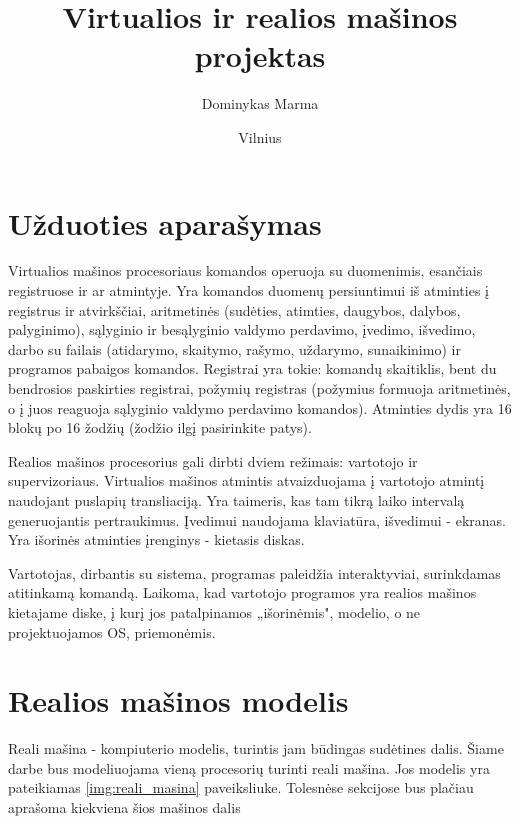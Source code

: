\documentclass{VUMIFInfKursinis}
\institute{Informatikos institutas}  %
\title{Virtualios ir realios mašinos projektas}
\author{Dominykas Marma}
\date{Vilnius \\ \the\year}
\begin{document}
\maketitle

\tableofcontents

\section{Užduoties aparašymas}

Virtualios mašinos procesoriaus komandos operuoja su duomenimis, esančiais registruose ir ar atmintyje. Yra komandos duomenų persiuntimui iš atminties į registrus ir atvirkščiai, aritmetinės (sudėties, atimties, daugybos, dalybos, palyginimo), sąlyginio ir besąlyginio valdymo perdavimo, įvedimo, išvedimo, darbo su failais (atidarymo, skaitymo, rašymo, uždarymo, sunaikinimo) ir programos pabaigos komandos. Registrai yra tokie: komandų skaitiklis, bent du bendrosios paskirties registrai, požymių registras (požymius formuoja aritmetinės, o į juos reaguoja sąlyginio valdymo perdavimo komandos). Atminties dydis yra 16 blokų po 16 žodžių (žodžio ilgį pasirinkite patys).

Realios mašinos procesorius gali dirbti dviem režimais: vartotojo ir supervizoriaus. Virtualios mašinos atmintis atvaizduojama į vartotojo atmintį naudojant puslapių transliaciją. Yra taimeris, kas tam tikrą laiko intervalą generuojantis pertraukimus. Įvedimui naudojama klaviatūra, išvedimui - ekranas. Yra išorinės atminties įrenginys - kietasis diskas.

Vartotojas, dirbantis su sistema, programas paleidžia interaktyviai, surinkdamas atitinkamą komandą. Laikoma, kad vartotojo programos yra realios mašinos kietajame diske, į kurį jos patalpinamos „išorinėmis", modelio, o ne projektuojamos OS, priemonėmis.

\section{Realios mašinos modelis}

Reali mašina - kompiuterio modelis, turintis jam būdingas sudėtines dalis. Šiame darbe bus modeliuojama vieną procesorių turinti reali mašina. Jos modelis yra pateikiamas \ref{img:reali_masina} paveiksliuke. Tolesnėse sekcijose bus plačiau aprašoma kiekviena šios mašinos dalis
\end{document}
